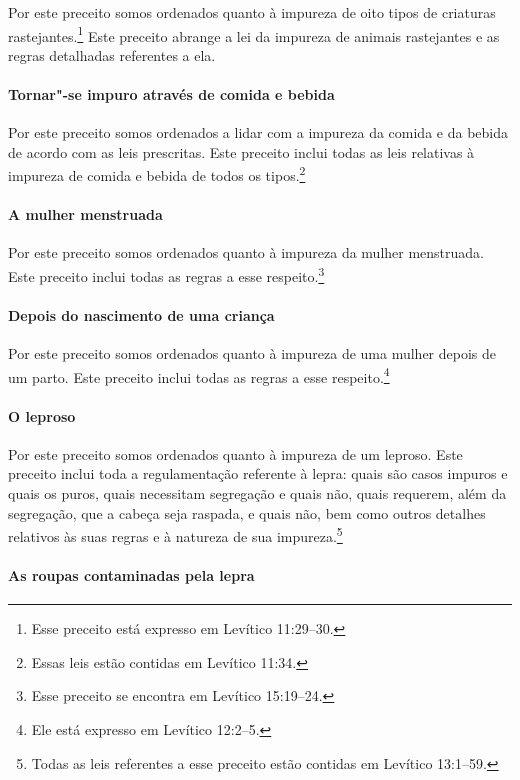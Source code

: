 \begin{multicols}{2}
Por este preceito somos ordenados quanto à impureza de oito tipos
de criaturas rastejantes.\footnote{Esse preceito está expresso em Levítico 11:29--30.} Este preceito abrange a
lei da impureza de animais rastejantes e as regras detalhadas referentes
a ela.

\paragraph{Tornar"-se impuro através de comida e bebida}

Por este preceito somos ordenados a lidar com a impureza da comida e da
bebida de acordo com as leis prescritas. Este preceito inclui todas as
leis relativas à impureza de comida e bebida de todos os
tipos.\footnote{Essas leis estão contidas em Levítico 11:34.}

\paragraph{A mulher menstruada}

Por este preceito somos ordenados quanto à impureza da mulher
menstruada. Este preceito inclui todas as regras a esse
respeito.\footnote{Esse preceito se encontra em Levítico 15:19--24.}

\paragraph{Depois do nascimento de uma criança}

Por este preceito somos ordenados quanto à impureza de uma mulher
depois de um parto. Este preceito inclui todas as regras a esse
respeito.\footnote{Ele está expresso em Levítico 12:2--5.}

\paragraph{O leproso}

Por este preceito somos ordenados quanto à impureza de um leproso. Este
preceito inclui toda a regulamentação referente à lepra: quais são casos
impuros e quais os puros, quais necessitam segregação e quais não, quais
requerem, além da segregação, que a cabeça seja raspada, e quais não,
bem como outros detalhes relativos às suas regras e à natureza de sua
impureza.\footnote{Todas as leis referentes a esse preceito estão contidas em Levítico
  13:1--59.}



\paragraph{As roupas contaminadas pela lepra}


\end{multicols}
